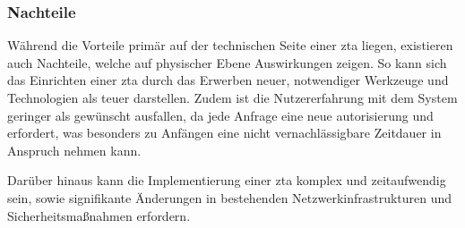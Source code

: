 \subsubsection{Nachteile}\label{subsubsec:nachteile}
Während die Vorteile primär auf der technischen Seite einer \ac{zta} liegen, existieren auch Nachteile, welche auf physischer Ebene Auswirkungen zeigen.
So kann sich das Einrichten einer \ac{zta} durch das Erwerben neuer, notwendiger Werkzeuge und Technologien als teuer darstellen.\autocite[\vglf][]{shore-2021}
Zudem ist die Nutzererfahrung mit dem System geringer als gewünscht ausfallen, da jede Anfrage eine neue \gls{autorisierung} und  erfordert, was besonders zu Anfängen eine nicht vernachlässigbare Zeitdauer in Anspruch nehmen kann.\autocite[\vglf][]{shore-2021}

Darüber hinaus kann die Implementierung einer \ac{zta} komplex und zeitaufwendig sein, sowie signifikante Änderungen in bestehenden Netzwerkinfrastrukturen und Sicherheitsmaßnahmen erfordern.\autocites[\vglf][]{shore-2021}[\vglf][]{buck-2021}